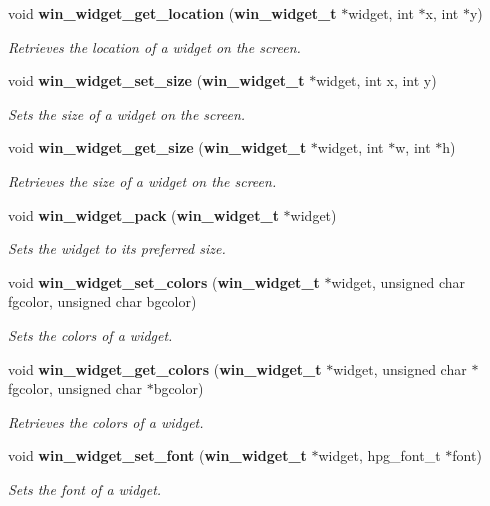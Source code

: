 \begin{CompactItemize}
void {\bf win\_\-widget\_\-get\_\-location} ({\bf win\_\-widget\_\-t} $\ast$widget, int $\ast$x, int $\ast$y)
\begin{CompactList}\small\item\em Retrieves the location of a widget on the screen. \item\end{CompactList}\item 
void {\bf win\_\-widget\_\-set\_\-size} ({\bf win\_\-widget\_\-t} $\ast$widget, int x, int y)
\begin{CompactList}\small\item\em Sets the size of a widget on the screen. \item\end{CompactList}\item 
void {\bf win\_\-widget\_\-get\_\-size} ({\bf win\_\-widget\_\-t} $\ast$widget, int $\ast$w, int $\ast$h)
\begin{CompactList}\small\item\em Retrieves the size of a widget on the screen. \item\end{CompactList}\item 
void {\bf win\_\-widget\_\-pack} ({\bf win\_\-widget\_\-t} $\ast$widget)
\begin{CompactList}\small\item\em Sets the widget to its preferred size. \item\end{CompactList}\item 
void {\bf win\_\-widget\_\-set\_\-colors} ({\bf win\_\-widget\_\-t} $\ast$widget, unsigned char fgcolor, unsigned char bgcolor)
\begin{CompactList}\small\item\em Sets the colors of a widget. \item\end{CompactList}\item 
void {\bf win\_\-widget\_\-get\_\-colors} ({\bf win\_\-widget\_\-t} $\ast$widget, unsigned char $\ast$fgcolor, unsigned char $\ast$bgcolor)
\begin{CompactList}\small\item\em Retrieves the colors of a widget. \item\end{CompactList}\item 
void {\bf win\_\-widget\_\-set\_\-font} ({\bf win\_\-widget\_\-t} $\ast$widget, hpg\_\-font\_\-t $\ast$font)
\begin{CompactList}\small\item\em Sets the font of a widget. \item\end{CompactList}\item 

\end{CompactItemize}
